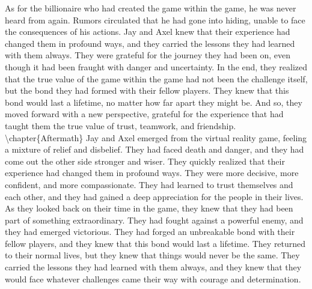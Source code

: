\documentclass{book}%
\begin{document}
As for the billionaire who had created the game within the game, he was never heard from again. Rumors circulated that he had gone into hiding, unable to face the consequences of his actions.\newline%
\newline%
Jay and Axel knew that their experience had changed them in profound ways, and they carried the lessons they had learned with them always. They were grateful for the journey they had been on, even though it had been fraught with danger and uncertainty.\newline%
\newline%
In the end, they realized that the true value of the game within the game had not been the challenge itself, but the bond they had formed with their fellow players. They knew that this bond would last a lifetime, no matter how far apart they might be.\newline%
\newline%
And so, they moved forward with a new perspective, grateful for the experience that had taught them the true value of trust, teamwork, and friendship.%
\textbackslash{}chapter\{Aftermath\}\newline%
\newline%
Jay and Axel emerged from the virtual reality game, feeling a mixture of relief and disbelief. They had faced death and danger, and they had come out the other side stronger and wiser.\newline%
\newline%
They quickly realized that their experience had changed them in profound ways. They were more decisive, more confident, and more compassionate. They had learned to trust themselves and each other, and they had gained a deep appreciation for the people in their lives.\newline%
\newline%
As they looked back on their time in the game, they knew that they had been part of something extraordinary. They had fought against a powerful enemy, and they had emerged victorious. They had forged an unbreakable bond with their fellow players, and they knew that this bond would last a lifetime.\newline%
\newline%
They returned to their normal lives, but they knew that things would never be the same. They carried the lessons they had learned with them always, and they knew that they would face whatever challenges came their way with courage and determination.\newline%
\end{document}
